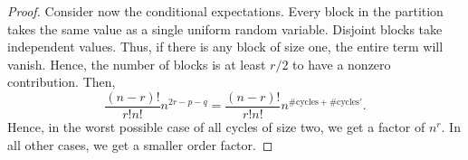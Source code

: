 \documentclass[10pt,a4paper]{amsart}
\begin{document}
\begin{proof}
Consider now the conditional expectations. Every block in the partition takes the same value as a single uniform random variable. Disjoint blocks take independent values. Thus, if there is any block of size one, the entire term will vanish. Hence, the number of blocks is at least $r/2$ to have a nonzero contribution. Then,
\[
\frac{(n-r)!}{r! n!} n^{2r-p-q}= \frac{(n-r)!}{r! n!} n^{\#\text{cycles}+ \#\text{cycles}'}.
\]
Hence, in the worst possible case of all cycles of size two, we get a factor of $n^r$. In all other cases, we get a smaller order factor. 

  
\end{proof}
\end{document}
